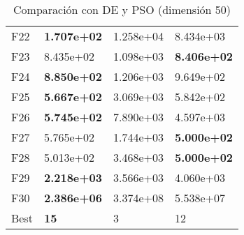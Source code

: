 \documentclass[10pt,a4paper]{article}
\begin{document}
\begin{table}[]
\begin{tabular}{|l|l|l|l|}
		F22  & \textbf{1.707e+02} & 1.258e+04          & 8.434e+03          \\
		F23  & 8.435e+02          & 1.098e+03          & \textbf{8.406e+02} \\
		F24  & \textbf{8.850e+02} & 1.206e+03          & 9.649e+02          \\
		F25  & \textbf{5.667e+02} & 3.069e+03          & 5.842e+02          \\
		F26  & \textbf{5.745e+02} & 7.890e+03          & 4.597e+03          \\
		F27  & 5.765e+02          & 1.744e+03          & \textbf{5.000e+02} \\
		F28  & 5.013e+02          & 3.468e+03          & \textbf{5.000e+02} \\
		F29  & \textbf{2.218e+03} & 3.566e+03          & 4.060e+03          \\
		F30  & \textbf{2.386e+06} & 3.374e+08          & 5.538e+07          \\ \hline
		Best & \textbf{15}        & 3                  & 12                 \\ \hline
	\end{tabular}
	\caption{Comparación con DE y PSO (dimensión 50)}
	\label{table:mimh2_dim50}
\end{table}

\newpage
\end{document}

